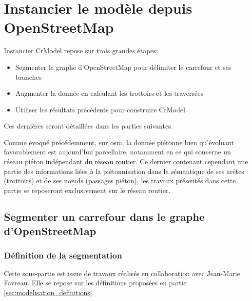 \section{Instancier le modèle depuis OpenStreetMap}

Instancier CrModel repose sur trois grandes étapes:
\begin{itemize}
    \item Segmenter le graphe d'OpenStreetMap pour délimiter le carrefour et ses branches
    \item Augmenter la donnée en calculant les trottoirs et les traversées
    \item Utiliser les résultats précédents pour construire CrModel
\end{itemize}

Ces dernières seront détaillées dans les parties suivantes.

\newpar{}

Comme évoqué précédemment, sur \gls{osm}, la donnée piétonne bien qu'évoluant favorablement est aujourd'hui parcellaire, notamment en ce qui concerne un réseau piéton indépendant du réseau routier. Ce dernier contenant cependant une partie des informations liées à la piétonnisation dans la sémantique de ses arêtes (trottoirs) et de ses nœuds (passages piéton), les travaux présentés dans cette partie se reposeront exclusivement sur le réseau routier.

\subsection{Segmenter un carrefour dans le graphe d'OpenStreetMap}

\subsubsection{Définition de la segmentation}

Cette sous-partie est issue de travaux réalisés en collaboration avec Jean-Marie Favreau. Elle se repose sur les définitions proposées en partie \ref{sec:modelisation_definitions}.

\newpar{}

